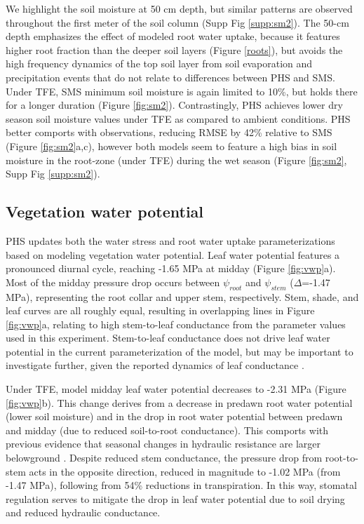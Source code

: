 \documentclass[draft,linenumbers]{agujournal}
\begin{document}
We highlight the soil moisture at 50 cm depth, but similar patterns are observed throughout the first meter of the soil column (Supp Fig \ref{supp:sm2}).
The 50-cm depth emphasizes the effect of modeled root water uptake, because it features higher root fraction than the deeper soil layers (Figure \ref{roots}), 
but avoids the high frequency dynamics of the top soil layer from soil evaporation and precipitation events that do not relate to differences between PHS and SMS.
Under TFE, SMS minimum soil moisture is again limited to 10\%, but holds there for a longer duration (Figure \ref{fig:sm2}).
Contrastingly, PHS achieves lower dry season soil moisture values under TFE as compared to ambient conditions.
PHS better comports with observations, reducing RMSE by 42\% relative to SMS (Figure \ref{fig:sm2}a,c),
however both models seem to feature a high bias in soil moisture in the root-zone (under TFE) during the wet season (Figure \ref{fig:sm2}, Supp Fig \ref{supp:sm2}).

\subsection{Vegetation water potential}

PHS updates both the water stress and root water uptake parameterizations based on modeling vegetation water potential.
Leaf water potential features a pronounced diurnal cycle, reaching -1.65 MPa at midday (Figure \ref{fig:vwp}a).
Most of the midday pressure drop occurs between $\psi_{root}$ and $\psi_{stem}$ ($\Delta$=-1.47 MPa), representing the root collar and upper stem, respectively.
Stem, shade, and leaf curves are all roughly equal, resulting in overlapping lines in Figure \ref{fig:vwp}a, relating to high stem-to-leaf conductance from the parameter values used in this experiment.
Stem-to-leaf conductance does not drive leaf water potential in the current parameterization of the model, but may be important to investigate further, given the reported dynamics of leaf conductance \citep{simonin2015}. 
    
    Under TFE, model midday leaf water potential decreases to -2.31 MPa (Figure \ref{fig:vwp}b). 
    This change derives from a decrease in predawn root water potential (lower soil moisture) and in the drop in root water potential between predawn and midday (due to reduced soil-to-root conductance).
    This comports with previous evidence that seasonal changes in hydraulic resistance are larger belowground \citep{fisher2006}.
    Despite reduced stem conductance, the pressure drop from root-to-stem acts in the opposite direction, reduced in magnitude to -1.02 MPa (from -1.47 MPa), following from 54\% reductions in transpiration.
    In this way, stomatal regulation serves to mitigate the drop in leaf water potential due to soil drying and reduced hydraulic conductance. 
\end{document}

